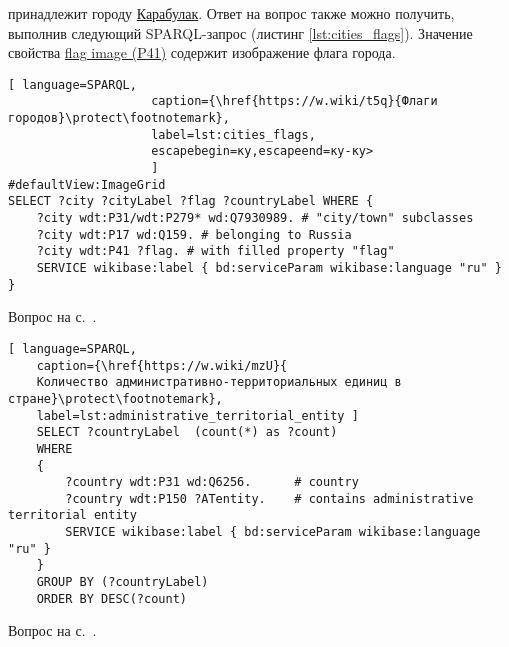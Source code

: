 \begin{task}
    \label{answer:cities_flags}
     принадлежит городу \href{https://w.wiki/oLF}{Карабулак}. Ответ на вопрос также можно получить, выполнив следующий SPARQL-запрос (листинг \ref{lst:cities_flags}). Значение свойства \href{https://www.wikidata.org/wiki/Property:P41}{flag image (P41)} содержит изображение флага города.
    
    \begin{lstlisting}[ language=SPARQL, 
                    caption={\href{https://w.wiki/t5q}{Флаги городов}\protect\footnotemark},
                    label=lst:cities_flags, 
                    escapebegin=ку,escapeend=ку-ку>
                    ]
#defaultView:ImageGrid
SELECT ?city ?cityLabel ?flag ?countryLabel WHERE {
	?city wdt:P31/wdt:P279* wd:Q7930989. # "city/town" subclasses
	?city wdt:P17 wd:Q159. # belonging to Russia	
	?city wdt:P41 ?flag. # with filled property "flag"
	SERVICE wikibase:label { bd:serviceParam wikibase:language "ru" }
}
\end{lstlisting}
    
    \small{Вопрос на с.~\pageref{lst:countries_sister_cities_with_Russia}.}
\end{task}


\begin{task}
	\label{answer:administrative_territorial}
	
	\begin{lstlisting}[ language=SPARQL, 
	caption={\href{https://w.wiki/mzU}{
	Количество административно-территориальных единиц в стране}\protect\footnotemark},
	label=lst:administrative_territorial_entity	]
	SELECT ?countryLabel  (count(*) as ?count)
	WHERE
	{
		?country wdt:P31 wd:Q6256.      # country
		?country wdt:P150 ?ATentity.    # contains administrative territorial entity
		SERVICE wikibase:label { bd:serviceParam wikibase:language "ru" }
	}
	GROUP BY (?countryLabel)
	ORDER BY DESC(?count)
	\end{lstlisting}
	
	\small{Вопрос на с.~\pageref{lst:age_of_country}.}
\end{task}

